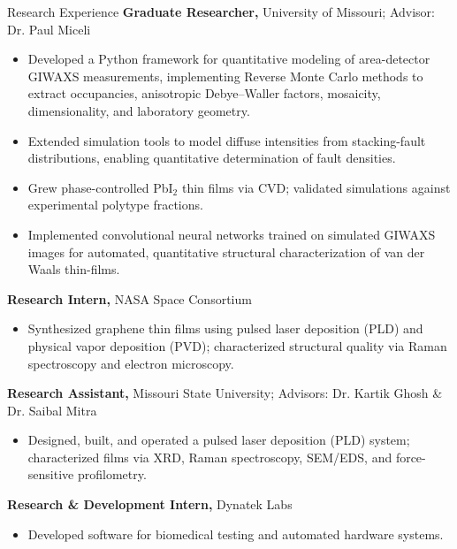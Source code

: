 \begin{rubric}{Research Experience}
    \entry*[2021 -- Present]%
    \textbf{Graduate Researcher,} University of Missouri; Advisor: Dr. Paul Miceli
    \begin{itemize}
        \item Developed a Python framework for quantitative modeling of area-detector GIWAXS measurements, implementing Reverse Monte Carlo methods to extract occupancies, anisotropic Debye--Waller factors, mosaicity, dimensionality, and laboratory geometry.
        \item Extended simulation tools to model diffuse intensities from stacking-fault distributions, enabling quantitative determination of fault densities.
        \item Grew phase-controlled PbI$_2$ thin films via CVD; validated simulations against experimental polytype fractions.
        \item Implemented convolutional neural networks trained on simulated GIWAXS images for automated, quantitative structural characterization of van der Waals thin-films.
    \end{itemize}

    \entry*[2019 -- 2020]%
        \textbf{Research Intern,} NASA Space Consortium
        \begin{itemize}
            \item Synthesized graphene thin films using pulsed laser deposition (PLD) and physical vapor deposition (PVD); characterized structural quality via Raman spectroscopy and electron microscopy.
        \end{itemize}

    \entry*[2017 -- 2020]%
        \textbf{Research Assistant,} Missouri State University; Advisors: Dr. Kartik Ghosh \& Dr. Saibal Mitra
        \begin{itemize}
        \item Designed, built, and operated a pulsed laser deposition (PLD) system; characterized films via XRD, Raman spectroscopy, SEM/EDS, and force-sensitive profilometry.
        \end{itemize}


    \entry*[2019]%
        \textbf{Research \& Development Intern,} Dynatek Labs
        \begin{itemize}
            \item Developed software for biomedical testing and automated hardware systems.
        \end{itemize}
\end{rubric}

